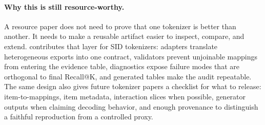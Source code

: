 \paragraph{Why this is still resource-worthy.}
A resource paper does not need to prove that one tokenizer is better than
another. It needs to make a reusable artifact easier to inspect, compare, and
extend. \tool contributes that layer for SID tokenizers: adapters translate
heterogeneous exports into one contract, validators prevent unjoinable mappings
from entering the evidence table, diagnostics expose failure modes that are
orthogonal to final Recall@K, and generated tables make the audit repeatable.
The same design also gives future tokenizer papers a checklist for what to
release: item-to-\sid mappings, item metadata, interaction slices when
possible, generator outputs when claiming decoding behavior, and enough
provenance to distinguish a faithful reproduction from a controlled proxy.
